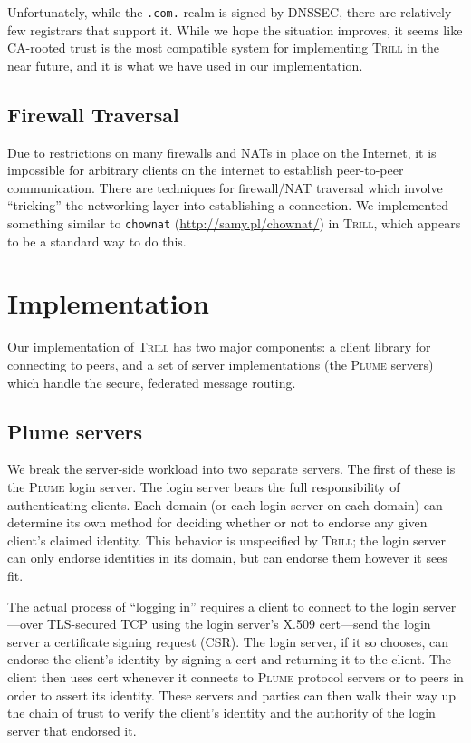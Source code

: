 \documentclass[11pt]{article}
\newcommand{\Trill}{\textsc{Trill}\xspace}
\newcommand{\Plume}{\textsc{Plume}\xspace}
\begin{document}
Unfortunately, while the \verb`.com.` realm is signed by DNSSEC, there are
relatively few registrars that support it. While we hope the situation improves,
it seems like CA-rooted trust is the most compatible system for implementing
\Trill in the near future, and it is what we have used in our implementation.

\subsection{Firewall Traversal}

Due to restrictions on many firewalls and NATs in place on the Internet, it is
impossible for arbitrary clients on the internet to establish peer-to-peer
communication. There are techniques for firewall/NAT traversal which involve
``tricking'' the networking layer into establishing a connection. We implemented
something similar to \texttt{chownat} (\url{http://samy.pl/chownat/}) in \Trill,
which appears to be a standard way to do this.

\section{Implementation}

Our implementation of \Trill has two major components: a client library for
connecting to peers, and a set of server implementations (the \Plume servers)
which handle the secure, federated message routing.

\subsection{Plume servers}

We break the server-side workload into two separate servers.  The first of
these is the \Plume login server.  The login server bears the full
responsibility of authenticating clients.  Each domain (or each login server on
each domain) can determine its own method for deciding whether or not to
endorse any given client's claimed identity.  This behavior is unspecified by
\Trill; the login server can only endorse identities in its domain, but can
endorse them however it sees fit.

The actual process of ``logging in'' requires a client to connect to the login
server---over TLS-secured TCP using the login server's X.509 cert---send the
login server a certificate signing request (CSR).  The login server, if it so
chooses, can endorse the client's identity by signing a cert and returning it
to the client.  The client then uses cert whenever it connects to \Plume
protocol servers or to peers in order to assert its identity.  These servers
and parties can then walk their way up the chain of trust to verify the
client's identity and the authority of the login server that endorsed it.
\end{document}
